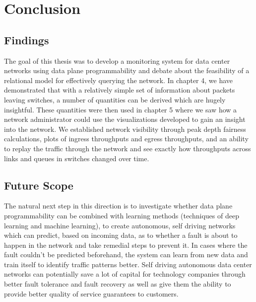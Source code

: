 
\chapter{Conclusion} %

\label{Chapter6} %


\section{Findings}
The goal of this thesis was to develop a monitoring system for data center networks using
data plane programmability and debate about the feasibility of a relational model for effectively querying the network. 
In chapter 4, we have 
demonstrated that with a relatively simple set of information about packets leaving switches, a number of quantities can be
derived which are hugely insightful. These quantities were then used in chapter 5 where we saw how a network
administrator could use the visualizations developed to gain an insight into the network. We established network visibility
through peak depth fairness calculations, plots of ingress throughputs and egress throughputs, and an ability to replay the
traffic through the network and see exactly how throughputs across links and queues in switches changed over time.
\section{Future Scope}
The natural next step in this direction is to investigate whether data plane programmability can be combined with
learning methods (techniques of deep learning and machine learning), to create autonomous, self driving networks which
can predict, based on incoming data, as to whether a fault is about to happen in the network and take remedial steps to prevent it.
In cases where the fault couldn't be predicted beforehand, the system can learn from new data and train itself to identify traffic
patterns better. Self driving autonomous data center networks can potentially save a lot of capital for technology companies through
better fault tolerance and fault recovery
as well as give them the ability to
provide better quality of service guarantees to customers.


